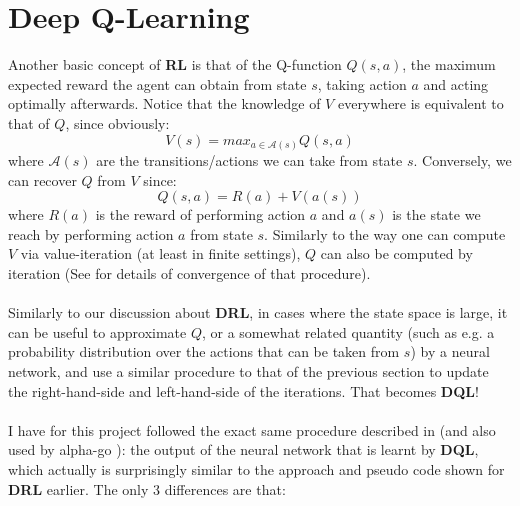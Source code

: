 \section{Deep Q-Learning}

Another basic concept of \textbf{RL} is that of the Q-function $Q(s, a)$, the maximum expected reward the agent can obtain from state $s$, taking action $a$ and acting optimally afterwards. Notice that the knowledge of $V$ everywhere is equivalent to that of $Q$, since obviously:
\begin{equation} \label{eq:QI}
V(s) = max_{a \in \mathcal{A}(s)} Q(s, a)
\end{equation}
where $\mathcal{A}(s)$ are the transitions/actions we can take from state $s$. Conversely, we can recover $Q$ from $V$ since:
\begin{equation} \label{eq:QI2}
Q(s, a) = R(a) + V(a(s))
\end{equation}
where $R(a)$ is the reward of performing action $a$ and $a(s)$ is the state we reach by performing action $a$ from state $s$. Similarly to the way one can compute $V$ via value-iteration (at least in finite settings), $Q$ can also be computed by iteration (See \cite{Watkins1992} for details of convergence of that procedure).
\\
\\
Similarly to our discussion about \textbf{DRL}, in cases where the state space is large, it can be useful to approximate $Q$, or a somewhat related quantity (such as e.g. a probability distribution over the actions that can be taken from $s$) by a neural network, and use a similar procedure to that of the previous section to update the right-hand-side and left-hand-side of the iterations. That becomes \textbf{DQL}!
\\
\\
I have for this project followed the exact same procedure described in \cite{https://doi.org/10.48550/arxiv.1805.07470} (and also used by alpha-go \cite{AlphaGo}): the output of the neural network that is learnt by \textbf{DQL}, which actually is surprisingly similar to the approach and pseudo code shown for \textbf{DRL} earlier. The only 3 differences are that:
